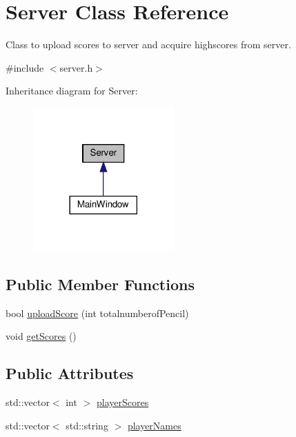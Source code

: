 \hypertarget{classServer}{}\section{Server Class Reference}
\label{classServer}


Class to upload scores to server and acquire highscores from server.  




{\ttfamily \#include $<$server.\+h$>$}



Inheritance diagram for Server\+:\nopagebreak
\begin{figure}[H]
\begin{center}
\leavevmode
\includegraphics[width=153pt]{classServer__inherit__graph}
\end{center}
\end{figure}
\subsection*{Public Member Functions}
\begin{DoxyCompactItemize}
\item 
bool \hyperlink{classServer_a1675e8a33c0e4f9f2d51d3de16981e66}{upload\+Score} (int totalnumberof\+Pencil)
\item 
void \hyperlink{classServer_ad8a93d69ede1b02b2ef9ff6bd31a325a}{get\+Scores} ()
\end{DoxyCompactItemize}
\subsection*{Public Attributes}
\begin{DoxyCompactItemize}
\item 
std\+::vector$<$ int $>$ \hyperlink{classServer_ae3bc58033f416d6bb1ff65e37b75fdc0}{player\+Scores}
\item 
std\+::vector$<$ std\+::string $>$ \hyperlink{classServer_a814400b9c0b97860b692a608fffa0115}{player\+Names}
\end{DoxyCompactItemize}


